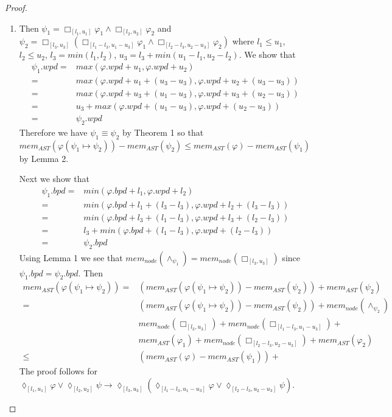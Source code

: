 \documentclass{article}
\begin{document}
\begin{proof}
\begin{enumerate}
The proof for the rule $\lozenge_{[l_1,u_1]}{\lozenge_{[l_2,u_2]}{\varphi}} \rightarrow \lozenge_{[l_1+l_2,u_1+u_2]}{\varphi}$ follows.

    \item[(R2):] Then $\psi_1 = \Box_{[l_1,u_1]}{\varphi_1} \land \Box_{[l_2,u_2]}{\varphi_2}$ and $\psi_2 = \Box_{[l_3,u_3]}{(\Box_{[l_1-l_3,u_1-u_3]}{\varphi_1} \land \Box_{[l_2-l_3,u_2-u_3]}{\varphi_2})}$ where $l_1 \leq u_1$, $l_2 \leq u_2$, $l_3 = min(l_1,l_2)$, $u_3 = l_3 + min(u_1-l_1,u_2-l_2)$.
We show that 
\begin{align*}
\psi_1.wpd = & max(\varphi.wpd + u_1, \varphi.wpd + u_2) \\
= & max(\varphi.wpd + u_1 + (u_3-u_3), \varphi.wpd + u_2 + (u_3-u_3)) \\
= & max(\varphi.wpd + u_3 + (u_1-u_3), \varphi.wpd + u_3 + (u_2-u_3)) \\
= & u_3 + max(\varphi.wpd + (u_1-u_3), \varphi.wpd + (u_2-u_3)) \\
= & \psi_2.wpd
\end{align*}
Therefore we have $\psi_1 \equiv \psi_2$ by Theorem 1 so that $mem_{AST}(\varphi(\psi_1 \mapsto \psi_2)) - mem_{AST}(\psi_2)  \leq mem_{AST}(\varphi) - mem_{AST}(\psi_1)$ by Lemma 2. 

Next we show that 
\begin{align*}
\psi_1.bpd = & min(\varphi.bpd + l_1, \varphi.wpd + l_2) \\
= & min(\varphi.bpd + l_1 + (l_3 - l_3), \varphi.wpd + l_2 + (l_3 - l_3)) \\
= & min(\varphi.bpd + l_3 + (l_1 - l_3), \varphi.wpd + l_3 + (l_2 - l_3)) \\
= & l_3 + min(\varphi.bpd + (l_1 - l_3), \varphi.wpd + (l_2 - l_3)) \\
= & \psi_2.bpd
\end{align*}
Using Lemma 1 we see that $mem_{node}(\land_{\psi_1}) = mem_{node}(\Box_{[l_3,u_3]}{})$ since $\psi_1.bpd = \psi_2.bpd$. Then
\begin{align*}
mem_{AST}(\varphi(\psi_1 \mapsto \psi_2)) = & (mem_{AST}(\varphi(\psi_1 \mapsto \psi_2)) - mem_{AST}(\psi_2)) + mem_{AST}(\psi_2) \\
= & (mem_{AST}(\varphi(\psi_1 \mapsto \psi_2)) - mem_{AST}(\psi_2)) + mem_{node}(\land_{\psi_2}) \\
& mem_{node}(\Box_{[l_3,u_3]}{}) + mem_{node}(\Box_{[l_1-l_3,u_1-u_3]}{}) + \\
& mem_{AST}(\varphi_1) + mem_{node}(\Box_{[l_2-l_3,u_2-u_3]}{}) + mem_{AST}(\varphi_2) \\
\leq & (mem_{AST}(\varphi) - mem_{AST}(\psi_1)) + 
\end{align*}
The proof follows for $\lozenge_{[l_1,u_1]}{\varphi} \lor \lozenge_{[l_2,u_2]}{\psi} \rightarrow \lozenge_{[l_3,u_3]}{(\lozenge_{[l_1-l_3,u_1-u_3]}{\varphi} \lor \lozenge_{[l_2-l_3,u_2-u_3]}{\psi})}$.


\end{enumerate}
\end{proof}
\end{document}
